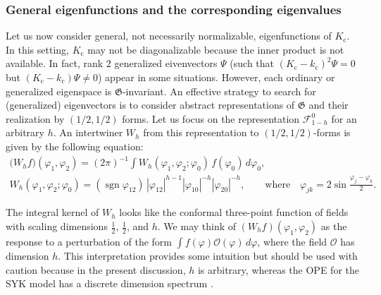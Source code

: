 \documentclass[12pt]{article}
\newcommand{\calF}{\mathcal{F}}
\newcommand{\calO}{\mathcal{O}}
\DeclareMathOperator{\sgn}{sgn}
\newcommand{\GG}{\mathfrak{G}}
\newcommand{\cc}{\mathrm{c}}
\newcommand{\vp}{\varphi}
\begin{document}
\subsubsection{General eigenfunctions and the corresponding eigenvalues}\label{sec_geneig}

Let us now consider general, not necessarily normalizable, eigenfunctions of $K_{\cc}$. In this setting, $K_{\cc}$ may not be diagonalizable because the inner product is not available. In fact, rank $2$ generalized eivenvectors $\Psi$ (such that $(K_{\cc}-k_{\cc})^2\Psi=0$ but $(K_{\cc}-k_{\cc})\Psi\not=0$) appear in some situations. However, each ordinary or generalized eigenspace is $\GG$-invariant. An effective strategy to search for (generalized) eigenvectors is to consider abstract representations of $\GG$ and their realization by $(1/2,1/2)$ forms. Let us focus on the representation $\calF^0_{1-h}$ for an arbitrary $h$. An intertwiner $W_{h}$ from this representation to $(1/2,1/2)$-forms is given by the following equation:
\begin{gather}
\bigl(W_{h}f\bigr)(\vp_1,\vp_2)
=(2\pi)^{-1}\int W_{h}(\vp_1,\vp_2;\vp_0)\,f(\vp_0)\,d\vp_0,\\[3pt]
\label{W_h}
W_{h}(\vp_1,\vp_2;\vp_0)
=(\sgn\vp_{12})\,|\vp_{12}|^{h-1}|\vp_{10}|^{-h}|\vp_{20}|^{-h},\qquad
\text{where}\quad
\vp_{jk}=2\sin\frac{\vp_j-\vp_k}{2}.
\end{gather}

The integral kernel of $W_{h}$ looks like the conformal three-point function of fields with scaling dimensions $\frac{1}{2}$, $\frac{1}{2}$, and $h$. We may think of $(W_{h}f)(\vp_1,\vp_2)$ as the response to a perturbation of the form $\int f(\vp)\calO(\vp)\,d\vp$, where the field $\calO$ has dimension $h$. This interpretation provides some intuition but should be used with caution because in the present discussion, $h$ is arbitrary, whereas the OPE for the SYK model has a discrete dimension spectrum \cite{MS16}.
\end{document}
